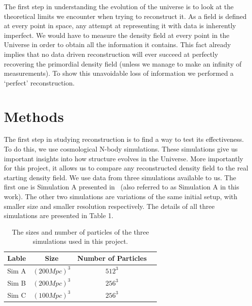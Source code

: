 

\indent The first step in understanding the evolution of the universe is to look at the theoretical limits we encounter when trying to reconstruct it. As a field is defined at every point in space, any attempt at representing it with data is inherently imperfect. We would have to measure the density field at every point in the Universe in order to obtain all the information it contains. This fact already implies that no data driven reconstruction will ever succeed at perfectly recovering the primordial density field (unless we manage to make an infinity of measurements). To show this unavoidable loss of information we performed a `perfect' reconstruction. 

\section{Methods}


The first step in studying reconstruction is to find a way to test its effectiveness. To do this, we use cosmological N-body simulations. These simulations give us important insights into how structure evolves in the Universe. More importantly for this project, it allows us to compare any reconstructed density field to the real starting density field. We use data from three simulations available to us. The first one is Simulation A presented in~\cite{Pontzen_paired_simulations} (also referred to as Simulation A in this work). The other two simulations are variations of the same initial setup, with smaller size and smaller resolution respectively. The details of all three simulations are presented in Table 1.

\begin{table}[h!]
    \centering
    \begin{tabular}{ |c|c|c|c| } 
        \hline
        Lable & Size & Number of Particles \\
        \hline
        Sim A & $(200 Mpc)^3$ & $512^3$  \\ 
        \hline
        Sim B & $(200 Mpc)^3$ & $256^3$  \\ 
        \hline
        Sim C & $(100 Mpc)^3$ & $256^3$  \\ 
        \hline
        
    \end{tabular}
    \caption{The sizes and number of particles of the three simulations used in this project.}
    \label{table:1}
\end{table}

